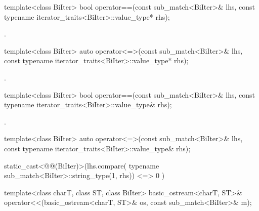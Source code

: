 %
\begin{itemdecl}
template<class BiIter>
  bool operator==(const sub_match<BiIter>& lhs,
                  const typename iterator_traits<BiIter>::value_type* rhs);
\end{itemdecl}

\begin{itemdescr}
\pnum
\returns
{}.
\end{itemdescr}

%
\begin{itemdecl}
template<class BiIter>
  auto operator<=>(const sub_match<BiIter>& lhs,
                   const typename iterator_traits<BiIter>::value_type* rhs);
\end{itemdecl}

\begin{itemdescr}
\pnum
\returns
{}.
\end{itemdescr}

%
\begin{itemdecl}
template<class BiIter>
  bool operator==(const sub_match<BiIter>& lhs,
                  const typename iterator_traits<BiIter>::value_type& rhs);
\end{itemdecl}

\begin{itemdescr}
\pnum
\returns
{}.
\end{itemdescr}

%
\begin{itemdecl}
template<class BiIter>
  auto operator<=>(const sub_match<BiIter>& lhs,
                   const typename iterator_traits<BiIter>::value_type& rhs);
\end{itemdecl}

\begin{itemdescr}
\pnum
\returns
\begin{codeblock}
static_cast<@@(BiIter)>(lhs.compare(
    typename sub_match<BiIter>::string_type(1, rhs))
      <=> 0
    )
\end{codeblock}
\end{itemdescr}

%
%
\begin{itemdecl}
template<class charT, class ST, class BiIter>
  basic_ostream<charT, ST>&
    operator<<(basic_ostream<charT, ST>& os, const sub_match<BiIter>& m);
\end{itemdecl}

